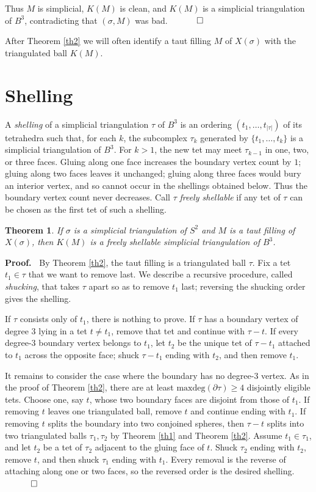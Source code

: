 \documentclass[12pt]{article}
\newtheorem{theorem}{Theorem}
\newcommand{\proofstart}{{\noindent \bf Proof.\ }}
\newcommand{\proofend}{$\quad \qed$}
\newcommand{\kw}{\mathrm}
\newcommand{\maxdeg}{\kw{maxdeg}}
\begin{document}
Thus $M$ is simplicial, $K(M)$ is clean, and $K(M)$ is a simplicial
triangulation of $B^3$, contradicting that $(\sigma,M)$ was bad.
\proofend

After Theorem \ref{th2} we will often identify a taut filling $M$ of
$X(\sigma)$ with the triangulated ball $K(M)$.

\section{Shelling}

A \emph{shelling} of a simplicial triangulation $\tau$ of $B^3$
is an ordering
$(t_1,\ldots,t_{|\tau|})$
of its tetrahedra such that, for each $k$,
the subcomplex $\tau_k$ generated by $\{t_1,\ldots,t_k\}$ is a
simplicial triangulation of $B^3$.
For $k>1$, the new tet may meet $\tau_{k-1}$ in one, two, or three
faces. Gluing along one face increases the boundary vertex count by $1$;
gluing along two faces leaves it unchanged; gluing along three faces
would bury an interior vertex, and so cannot occur in the shellings
obtained below. Thus the boundary vertex count never decreases.
Call $\tau$ \emph{freely shellable} if any tet of $\tau$ can be chosen as
the first tet of such a shelling.

\begin{theorem} \label{th3}
If $\sigma$ is a simplicial triangulation of $S^2$ and $M$ is a taut
filling of $X(\sigma)$, then $K(M)$ is a freely shellable simplicial
triangulation of $B^3$.
\end{theorem}

\proofstart
By Theorem \ref{th2}, the taut filling is a triangulated ball $\tau$.
Fix a tet $t_1 \in \tau$ that we want to remove last.  We describe a
recursive procedure, called \emph{shucking}, that takes $\tau$ apart
so as to remove $t_1$ last; reversing the shucking order gives the
shelling.

If $\tau$ consists only of $t_1$, there is nothing to prove.
If $\tau$ has a boundary vertex of degree $3$ lying in a tet
$t\ne t_1$, remove that tet and continue with $\tau-t$.
If every degree-$3$ boundary vertex belongs to $t_1$, let $t_2$ be the
unique tet of $\tau-t_1$ attached to $t_1$ across the opposite face;
shuck $\tau-t_1$ ending with $t_2$, and then remove $t_1$.

It remains to consider the case where the boundary has no degree-$3$
vertex.  As in the proof of Theorem \ref{th2}, there are at least
$\maxdeg(\partial \tau)\geq 4$ disjointly eligible tets.
Choose one, say $t$, whose two boundary faces are disjoint from those of
$t_1$.
If removing $t$ leaves one triangulated ball, remove $t$ and continue
ending with $t_1$.
If removing $t$ splits the boundary into two conjoined spheres, then
$\tau-t$ splits into two triangulated balls $\tau_1,\tau_2$ by
Theorem \ref{th1} and Theorem \ref{th2}.
Assume $t_1\in \tau_1$, and let $t_2$ be a tet of $\tau_2$ adjacent to
the gluing face of $t$.
Shuck $\tau_2$ ending with $t_2$, remove $t$, and then shuck
$\tau_1$ ending with $t_1$.
Every removal is the reverse of attaching along one or two faces, so the
reversed order is the desired shelling.
\proofend
\end{document}

